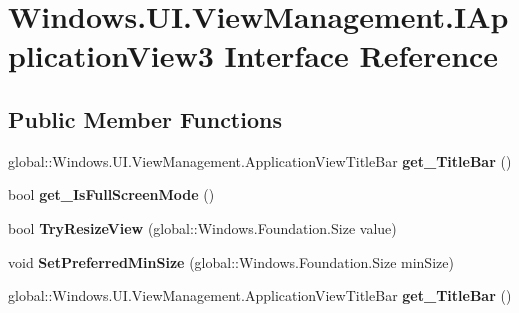 \hypertarget{interface_windows_1_1_u_i_1_1_view_management_1_1_i_application_view3}{}\section{Windows.\+U\+I.\+View\+Management.\+I\+Application\+View3 Interface Reference}
\label{interface_windows_1_1_u_i_1_1_view_management_1_1_i_application_view3}
\subsection*{Public Member Functions}
\begin{DoxyCompactItemize}
\item 
\mbox{\label{interface_windows_1_1_u_i_1_1_view_management_1_1_i_application_view3_acc34a016b86b681c63d56374afcb3583}} 
global\+::\+Windows.\+U\+I.\+View\+Management.\+Application\+View\+Title\+Bar {\bfseries get\+\_\+\+Title\+Bar} ()
\item 
\mbox{\label{interface_windows_1_1_u_i_1_1_view_management_1_1_i_application_view3_a9812a28b2f40c23228f4696cd1042fe8}} 
bool {\bfseries get\+\_\+\+Is\+Full\+Screen\+Mode} ()
\item 
\mbox{\label{interface_windows_1_1_u_i_1_1_view_management_1_1_i_application_view3_a20cf9528ed2169b0c836294dd5750097}} 
bool {\bfseries Try\+Resize\+View} (global\+::\+Windows.\+Foundation.\+Size value)
\item 
\mbox{\label{interface_windows_1_1_u_i_1_1_view_management_1_1_i_application_view3_abb301c42e193451baed06bd07c92fc46}} 
void {\bfseries Set\+Preferred\+Min\+Size} (global\+::\+Windows.\+Foundation.\+Size min\+Size)
\item 
\mbox{\label{interface_windows_1_1_u_i_1_1_view_management_1_1_i_application_view3_acc34a016b86b681c63d56374afcb3583}} 
global\+::\+Windows.\+U\+I.\+View\+Management.\+Application\+View\+Title\+Bar {\bfseries get\+\_\+\+Title\+Bar} ()

\end{DoxyCompactItemize}
